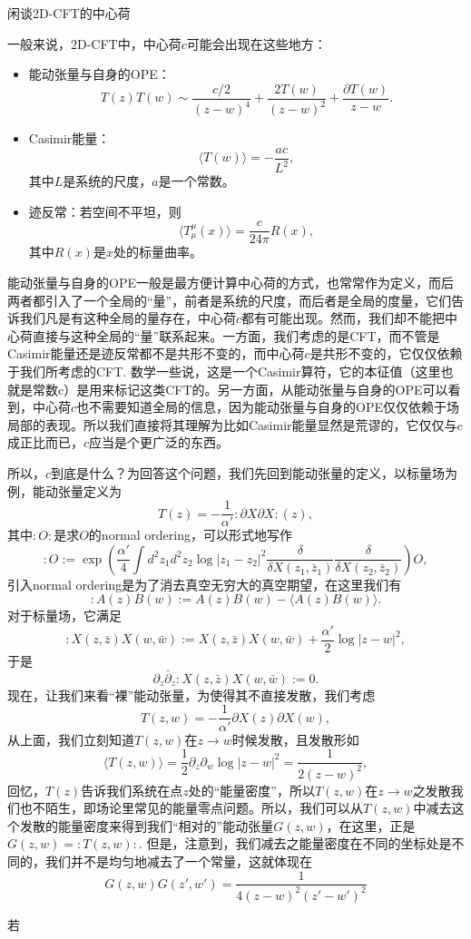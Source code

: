 \documentclass[12pt]{article}
\theoremstyle{definition}
\theoremstyle{plain}
\begin{document}
闲谈2D-CFT的中心荷

一般来说，2D-CFT中，中心荷$c$可能会出现在这些地方：

\begin{itemize}
    \item 能动张量与自身的OPE：
    \[
        T(z)T(w)\sim \frac{c/2}{(z-w)^4}+\frac{2T(w)}{(z-w)^2}+\frac{\partial T(w)}{z-w}.
    \]
    \item Casimir能量：
    \[
        \langle T(w)\rangle = -\frac{ac}{L^2},
    \]
    其中$L$是系统的尺度，$a$是一个常数。
    \item 迹反常：若空间不平坦，则
    \[
        \langle T^\mu_\mu(x)\rangle=\frac{c}{24\pi}R(x),
    \]
    其中$R(x)$是$x$处的标量曲率。
\end{itemize}
能动张量与自身的OPE一般是最方便计算中心荷的方式，也常常作为定义，而后两者都引入了一个全局的“量”，前者是系统的尺度，而后者是全局的度量，它们告诉我们凡是有这种全局的量存在，中心荷$c$都有可能出现。然而，我们却不能把中心荷直接与这种全局的“量”联系起来。一方面，我们考虑的是CFT，而不管是Casimir能量还是迹反常都不是共形不变的，而中心荷$c$是共形不变的，它仅仅依赖于我们所考虑的CFT. 数学一些说，这是一个Casimir算符，它的本征值（这里也就是常数c）是用来标记这类CFT的。另一方面，从能动张量与自身的OPE可以看到，中心荷$c$也不需要知道全局的信息，因为能动张量与自身的OPE仅仅依赖于场局部的表现。所以我们直接将其理解为比如Casimir能量显然是荒谬的，它仅仅与$c$成正比而已，$c$应当是个更广泛的东西。

所以，$c$到底是什么？为回答这个问题，我们先回到能动张量的定义，以标量场为例，能动张量定义为
\[
    T(z)=-\frac{1}{\alpha'}:\partial X\partial X:(z),
\]
其中$:O:$是求$O$的normal ordering，可以形式地写作
\[
    :O:=\exp\left(\frac{\alpha'}{4}\int d^2z_1d^2z_2 \log |z_1-z_2|^2 \frac{\delta}{\delta X(z_1,\bar z_1)}\frac{\delta}{\delta X(z_2,\bar z_2)}
        \right)O,
\]
引入normal ordering是为了消去真空无穷大的真空期望，在这里我们有
\[
    :A(z)B(w):=A(z)B(w)-\langle A(z)B(w)\rangle.
\]
对于标量场，它满足
\[
    :X(z,\bar z)X(w,\bar w):=X(z,\bar z)X(w,\bar w)+\frac{\alpha'}{2}\log |z-w|^2,
\]
于是
\[
    \partial_z\bar\partial_z :X(z,\bar z)X(w,\bar w):=0.
\]
现在，让我们来看“裸”能动张量，为使得其不直接发散，我们考虑
\[
    T(z,w)=-\frac{1}{\alpha'}\partial X(z)\partial X(w),
\]
从上面，我们立刻知道$T(z,w)$在$z\to w$时候发散，且发散形如
\[
    \langle T(z,w)\rangle =\frac12\partial_z\partial_w \log |z-w|^2=\frac 1{2 (z - w)^2},
\]
回忆，$T(z)$告诉我们系统在点$z$处的“能量密度”，所以$T(z,w)$在$z\to w$之发散我们也不陌生，即场论里常见的能量零点问题。所以，我们可以从$T(z,w)$中减去这个发散的能量密度来得到我们“相对的”能动张量$G(z,w)$，在这里，正是$G(z,w)=:T(z,w):$. 但是，注意到，我们减去之能量密度在不同的坐标处是不同的，我们并不是均匀地减去了一个常量，这就体现在
\[
    G(z,w)G(z',w')=\frac{1}{4(z-w)^2(z'-w')^2}
\]

若
\end{document}
